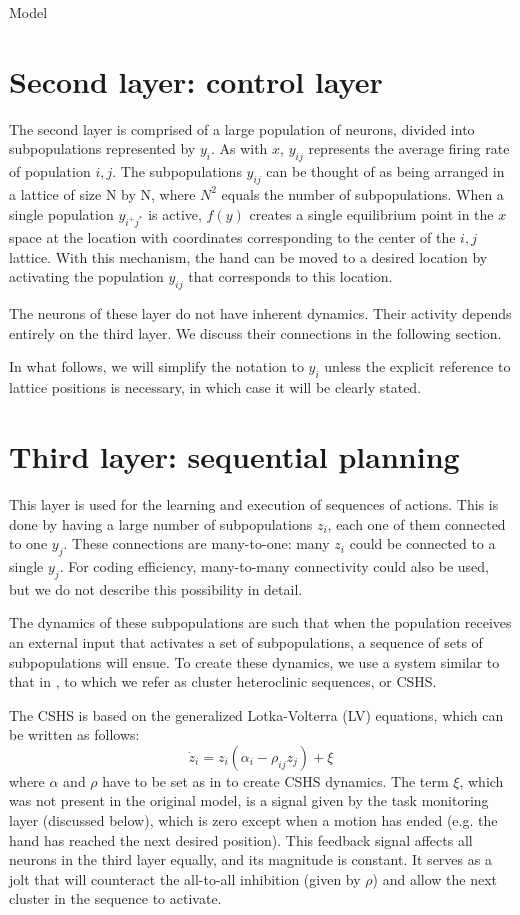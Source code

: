\documentclass{report}
\begin{document}
\begin{chapter}{Model}
\section{Second layer: control layer}
The second layer is comprised of a large population of neurons, divided into subpopulations represented by $y_i$. As with $x$, $y_{ij}$ represents the average firing rate of population $i,j$. The subpopulations $y_{ij}$ can be thought of as being arranged in a lattice of size N by N, where $N^2$ equals the number of subpopulations. When a single population $y_{i^+j^*}$ is active, $f(y)$ creates a single equilibrium point in the $x$ space at the location with coordinates corresponding to the center of the $i,j$ lattice. With this mechanism, the hand can be moved to a desired location by activating the population $y_{ij}$ that corresponds to this location.

The neurons of these layer do not have inherent dynamics. Their activity depends entirely on the third layer. We discuss their connections in the following section.

In what follows, we will simplify the notation to $y_i$ unless the explicit reference to lattice positions is necessary, in which case it will be clearly stated.

\section{Third layer: sequential planning}
This layer is used for the learning and execution of sequences of actions. This is done by having a large number of subpopulations $z_i$, each one of them connected to one $y_j$. These connections are many-to-one: many $z_i$ could be connected to a single $y_j$. For coding efficiency, many-to-many connectivity could also be used, but we do not describe this possibility in detail.

The dynamics of these subpopulations are such that when the population receives an external input that activates a set of subpopulations, a sequence of sets of subpopulations will ensue. To create these dynamics, we use a system similar to that in \citep{CuevasRivera_Modelling_2015}, to which we refer as cluster heteroclinic sequences, or CSHS.

The CSHS is based on the generalized Lotka-Volterra (LV) equations, which can be written as follows:
\begin{equation}
\dot z_i = z_i(\alpha_i - \rho_{ij}z_j) + \xi \label{eqn:third-level}
\end{equation}
where $\alpha$ and $\rho$ have to be set as in \citep{CuevasRivera_Modelling_2015} to create CSHS dynamics. The term $\xi$, which was not present in the original model, is a signal given by the task monitoring layer (discussed below), which is zero except when a motion has ended (e.g. the hand has reached the next desired position). This feedback signal affects all neurons in the third layer equally, and its magnitude is constant. It serves as a jolt that will counteract the all-to-all inhibition (given by $\rho$) and allow the next cluster in the sequence to activate.


\end{chapter}
\end{document}

